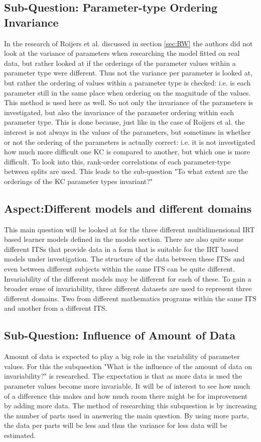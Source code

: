\documentclass{scrartcl}
\begin{document}
\subsection{Sub-Question: Parameter-type Ordering Invariance}
In the research of Roijers et al. discussed in section \ref{sec:RW} the authors did not look at the variance of parameters when researching the model fitted on real data, but rather looked at if the orderings of the parameter values within a parameter type were different. Thus not the variance per parameter is looked at, but rather the ordering of values within a parameter type is checked: i.e. is each parameter still in the same place when ordering on the magnitude of the values. This method is used here as well. So not only the invariance of the parameters is investigated, but also the invariance of the parameter ordering within each parameter type. This is done because, just like in the case of Roijers et al. the interest is not always in the values of the parameters, but sometimes in whether or not the ordering of the parameters is actually correct: i.e. it is not investigated how much more difficult one KC is compared to another, but which one is more difficult. To look into this, rank-order correlations of each parameter-type between splits are used. This leads to the sub-question "To what extent are the orderings of the KC parameter types invariant?" 

\subsection{Aspect:Different models and different domains}
This main question will be looked at for the three different multidimensional IRT based learner models defined in the models section. There are also quite some different ITSs that provide data in a form that is suitable for the IRT based models under investigation. The structure of the data between these ITSs and even between different subjects within the same ITS can be quite different. Invariability of the different models may be different for each of these. To gain a broader sense of invariability, three different datasets are used to represent three different domains. Two from different mathematics programs within the same ITS and another from a different ITS.

\subsection{Sub-Question: Influence of Amount of Data}
Amount of data is expected to play a big role in the variability of parameter values. For this the subquestion "What is the influence of the amount of data on invariability?" is researched. The expectation is that as more data is used the parameter values become more invariable. It will be of interest to see how much of a difference this makes and how much room there might be for improvement by adding more data. The method of researching this subquestion is by increasing the number of parts used in answering the main question. By using more parts, the data per parts will be less and thus the variance for less data will be estimated.
\end{document}
